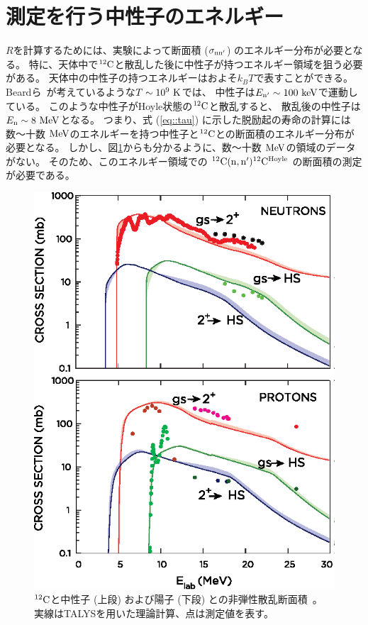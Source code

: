 \section{測定を行う中性子のエネルギー}
$R$を計算するためには、実験によって断面積 ($\sigma_{\rm nn'}$) のエネルギー分布が必要となる。
特に、天体中で${}^{12}{\rm C}$と散乱した後に中性子が持つエネルギー領域を狙う必要がある。
天体中の中性子の持つエネルギーはおよそ$k_{B}T$で表すことができる。
Beardら~\cite{hotdensemedium}が考えているような$T\sim10^{9}~{\rm K}$では、
中性子は$E_{\rm n'}\sim100~{\rm keV}$で運動している。%
このような中性子がHoyle状態の${}^{12}{\rm C}$と散乱すると、
散乱後の中性子は$E_{\rm n}\sim8~{\rm MeV}$となる。
つまり、式 (\ref{eq::tau}) に示した脱励起の寿命の計算には
数〜十数 ${\rm MeV}$のエネルギーを持つ中性子と${}^{12}{\rm C}$との断面積のエネルギー分布が必要となる。
しかし、図\ref{fig::crosssection_pres}からも分かるように、数〜十数 ${\rm MeV}$の領域のデータがない。
そのため、このエネルギー領域での ${}^{12}{\rm C}({\rm n,n'}){}^{12}{\rm C}^{{\rm Hoyle}}$ の断面積の測定が必要である。
\begin{figure}
  \centering
  \includegraphics[clip,width=0.6\columnwidth]{eps/cross_section_p_and_n.eps}
  \caption[${}^{12}{\rm C}$と中性子 (上段) および陽子 (下段) との非弾性散乱断面積。]
          {${}^{12}{\rm C}$と中性子 (上段) および陽子 (下段) との非弾性散乱断面積~\cite{hotdensemedium}。
  実線はTALYSを用いた理論計算、点は測定値を表す。}
  \label{fig::crosssection_pres}
\end{figure}

